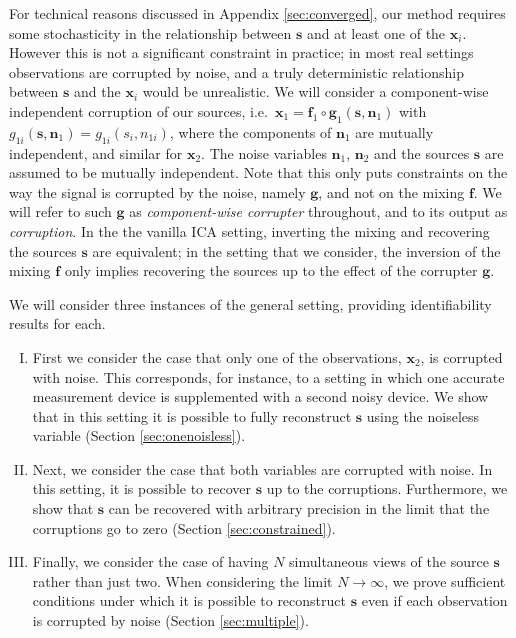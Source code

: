 \documentclass[letterpaper]{article}
\theoremstyle{definition}
\begin{document}
For technical reasons discussed in Appendix
\ref{sec:converged}, our method requires some stochasticity in the relationship between $\bm{s}$ and at least one of the $\bm{x}_i$.
However this is not a significant constraint in practice; in most real settings observations are corrupted by noise, and a truly deterministic relationship between $\bm{s}$ and the $\bm{x}_i$ would be unrealistic.
We will consider a component-wise independent corruption of our sources, i.e.~$\bm{x}_1 = \bm{f}_1 \circ \bm{g}_1(\bm{s}, \bm{n}_1)$ with $g_{1i}(\bm{s}, \bm{n}_1) = g_{1i}(s_i, n_{1i})$, where the components of $\bm{n}_{1}$ are mutually independent, and similar for $\bm{x}_2$. The noise variables $\bm{n}_1$, $\bm{n}_2$ and the sources $\bm{s}$ are assumed to be mutually independent.
Note that this only puts constraints on the way the signal is corrupted by the noise, namely $\bm{g}$, and not on the mixing $\bm{f}$.
We will refer to such $\bm{g}$ as \emph{component-wise corrupter} throughout, and to its output as \emph{corruption}.
In the the vanilla ICA setting, inverting the mixing and recovering the sources $\bm{s}$ are equivalent; in the setting that we consider, the inversion of the mixing $\bm{f}$ only implies recovering the sources up to the effect of the corrupter $\bm{g}$.

We will consider three instances of the general setting, providing identifiability results for each.
\begin{enumerate}[I.]
    \item First we consider the case that only one of the observations, $\bm{x}_2$, is corrupted with noise. This corresponds, for instance, to a setting in which one accurate measurement device is supplemented with a second noisy device. We show that in this setting it is possible to fully reconstruct $\bm{s}$ using the noiseless variable (Section \ref{sec:onenoisless}).
    \item Next, we consider the case that both variables are corrupted with noise. In this setting, it is possible to recover $\bm{s}$ up to the corruptions.     Furthermore, we show that $\bm{s}$ can be recovered with arbitrary precision in the limit that the corruptions go to zero (Section \ref{sec:constrained}).
    \item Finally, we consider the case of having $N$ simultaneous views of the source $\bm{s}$ rather than just two.
    When considering the limit $N \rightarrow \infty$, we prove sufficient conditions under which it is possible to reconstruct $\bm{s}$ even if each observation is corrupted by noise (Section \ref{sec:multiple}).
\end{enumerate}
\end{document}
